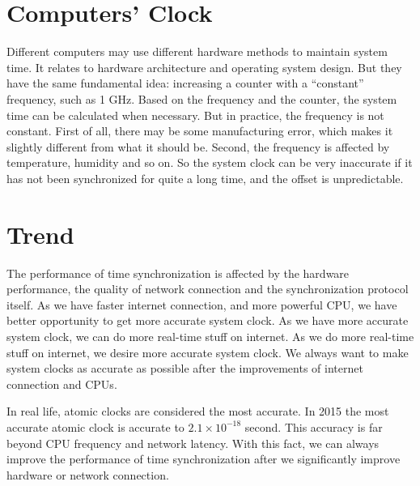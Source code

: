 \section{Computers' Clock}
\label{sec:computers_clock}
Different computers may use different hardware methods to maintain system time.
It relates to hardware architecture and operating system design. But they have
the same fundamental idea: increasing a counter with a ``constant'' frequency,
such as 1 GHz.
Based on the frequency and the counter, the system time can be calculated
when necessary. But in practice, the frequency is not constant. First of all,
there may be some manufacturing error, which makes it slightly different from
what it should be. Second, the frequency is affected by temperature, humidity
and so on. So the system clock can be very inaccurate if it has not been
synchronized for quite a long time, and the offset is unpredictable.

\section{Trend}
\label{sec:trend}
The performance of time synchronization is affected by the hardware
performance, the quality of network connection and the synchronization protocol
itself. 
As we have faster internet connection, and more powerful CPU, we have better
opportunity to get more accurate system clock. As we have more accurate system
clock, we can do more real-time stuff on internet. As we do more real-time
stuff on internet, we desire more accurate system clock. We always want to make
system clocks as accurate as possible after the improvements of internet
connection and CPUs. 

In real life, atomic clocks are considered the most accurate. In 2015 the most
accurate atomic clock is accurate to $2.1\times 10^{-18}$ second.
\cite{atomic_clock} %
This accuracy is far beyond CPU frequency and network latency. With this fact,
we can always improve the performance of time synchronization after we
significantly improve hardware or network connection.
